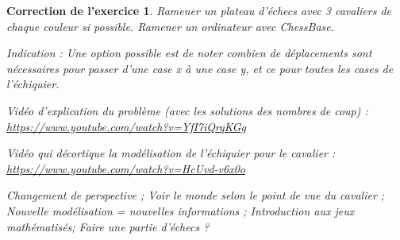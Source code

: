 \documentclass[12pt]{article}
\theoremstyle{break}
\newtheorem{cor}{Correction de l'exercice}
\begin{document}
\begin{cor}
\textit{Ramener un plateau d'échecs avec 3 cavaliers de chaque couleur si possible. Ramener un ordinateur avec ChessBase.}

\textit{Indication :
Une option possible est de noter combien de déplacements sont nécessaires pour passer d'une case x à une case y, et ce pour toutes les cases de l'échiquier.}

Vidéo d'explication du problème (avec les solutions des nombres de coup) : \url{https://www.youtube.com/watch?v=YfI7iQrqKGg}\newline


Vidéo qui décortique la modélisation de l'échiquier pour le cavalier : \url{https://www.youtube.com/watch?v=HcUvd-v6x0o}\newline

\textit{Changement de perspective ; Voir le monde selon le point de vue du cavalier ; Nouvelle modélisation = nouvelles informations ; Introduction aux jeux mathématisés; Faire une partie d'échecs ?}
\end{cor}
\end{document}
